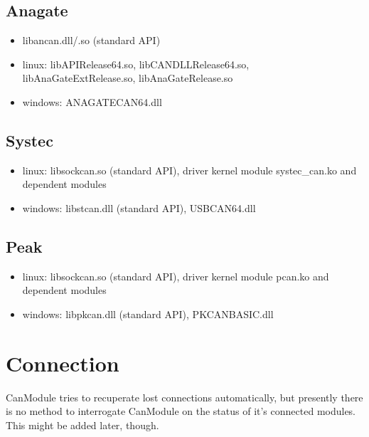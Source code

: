 \documentclass[letterpaper,10pt,english]{sphinxmanual}
\begin{document}
\section{Anagate}
\label{\detokenize{running:anagate}}\begin{itemize}
\item {} 
libancan.dll/.so  (standard API)

\item {} 
linux: libAPIRelease64.so, libCANDLLRelease64.so, libAnaGateExtRelease.so, libAnaGateRelease.so

\item {} 
windows: ANAGATECAN64.dll

\end{itemize}


\section{Systec}
\label{\detokenize{running:systec}}\begin{itemize}
\item {} 
linux: libsockcan.so (standard API), driver kernel module systec\_can.ko and dependent modules

\item {} 
windows: libstcan.dll (standard API), USBCAN64.dll

\end{itemize}


\section{Peak}
\label{\detokenize{running:peak}}\begin{itemize}
\item {} 
linux: libsockcan.so (standard API), driver kernel module pcan.ko and dependent modules

\item {} 
windows: libpkcan.dll (standard API), PKCANBASIC.dll

\end{itemize}


\chapter{Connection}
\label{\detokenize{connection:connection}}\label{\detokenize{connection::doc}}
CanModule tries to recuperate lost connections automatically, but presently there is no method
to interrogate CanModule on the status of it’s connected modules. This might be added later, though.
\end{document}
